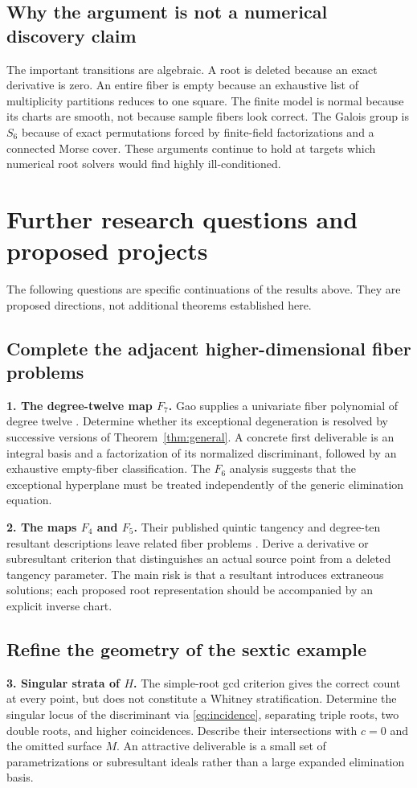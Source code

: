 \documentclass[11pt,a4paper]{article}
\theoremstyle{definition}
\begin{document}
\subsection{Why the argument is not a numerical discovery claim}
The important transitions are algebraic. A root is deleted because an
exact derivative is zero. An entire fiber is empty because an exhaustive
list of multiplicity partitions reduces to one square. The finite model
is normal because its charts are smooth, not because sample fibers look
correct. The Galois group is $S_6$ because of exact permutations forced
by finite-field factorizations and a connected Morse cover. These
arguments continue to hold at targets which numerical root solvers
would find highly ill-conditioned.

\section{Further research questions and proposed projects}
\label{sec:future}
The following questions are specific continuations of the results above.
They are proposed directions, not additional theorems established here.

\subsection{Complete the adjacent higher-dimensional fiber problems}
\textbf{1. The degree-twelve map $F_7$.} Gao supplies a univariate
fiber polynomial of degree twelve \cite[\S4.6]{Gao}. Determine whether
its exceptional degeneration is resolved by successive versions of
Theorem~\ref{thm:general}. A concrete first deliverable is an integral
basis and a factorization of its normalized discriminant, followed by
an exhaustive empty-fiber classification. The $F_6$ analysis suggests
that the exceptional hyperplane must be treated independently of the
generic elimination equation.

\textbf{2. The maps $F_4$ and $F_5$.} Their published quintic tangency
and degree-ten resultant descriptions leave related fiber problems
\cite[Appendix A.3]{Gao}. Derive a derivative or subresultant criterion
that distinguishes an actual source point from a deleted tangency
parameter. The main risk is that a resultant introduces extraneous
solutions; each proposed root representation should be accompanied by
an explicit inverse chart.

\subsection{Refine the geometry of the sextic example}
\textbf{3. Singular strata of $H$.} The simple-root gcd criterion gives
the correct count at every point, but does not constitute a Whitney
stratification. Determine the singular locus of the discriminant via
\eqref{eq:incidence}, separating triple roots, two double roots, and
higher coincidences. Describe their intersections with $c=0$ and the
omitted surface $M$. An attractive deliverable is a small set of
parametrizations or subresultant ideals rather than a large expanded
elimination basis.
\end{document}
